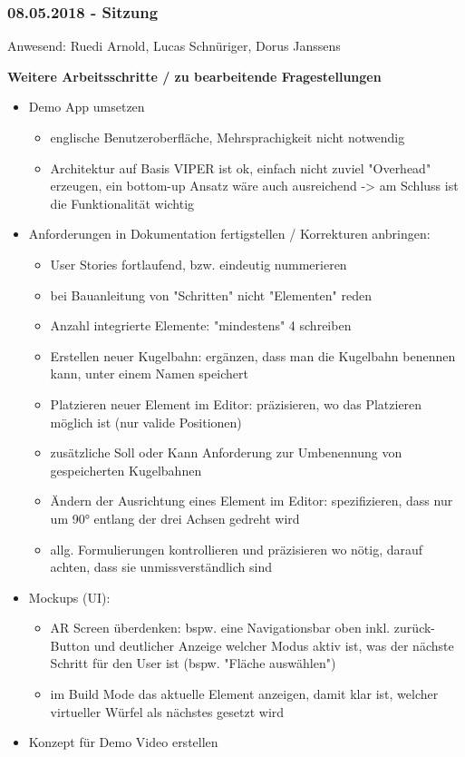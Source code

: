 \subsubsection*{08.05.2018 - Sitzung}

Anwesend: Ruedi Arnold, Lucas Schnüriger, Dorus Janssens

\textbf{Weitere Arbeitsschritte / zu bearbeitende Fragestellungen}
\begin{itemize}
	\item Demo App umsetzen
	\begin{itemize}
		\item englische Benutzeroberfläche, Mehrsprachigkeit nicht notwendig
		\item Architektur auf Basis VIPER ist ok, einfach nicht zuviel "Overhead" erzeugen, ein bottom-up Ansatz wäre auch ausreichend -> am Schluss ist die Funktionalität wichtig
	\end{itemize}
	\item Anforderungen in Dokumentation fertigstellen / Korrekturen anbringen:
	\begin{itemize}
		\item User Stories fortlaufend, bzw. eindeutig nummerieren
		\item bei Bauanleitung von "Schritten" nicht "Elementen" reden
		\item Anzahl integrierte Elemente: "mindestens" 4 schreiben
		\item Erstellen neuer Kugelbahn: ergänzen, dass man die Kugelbahn benennen kann, unter einem Namen speichert
		\item Platzieren neuer Element im Editor: präzisieren, wo das Platzieren möglich ist (nur valide Positionen)
		\item zusätzliche Soll oder Kann Anforderung zur Umbenennung von gespeicherten Kugelbahnen
		\item Ändern der Ausrichtung eines Element im Editor: spezifizieren, dass nur um 90° entlang der drei Achsen gedreht wird
		\item allg. Formulierungen kontrollieren und präzisieren wo nötig, darauf achten, dass sie unmissverständlich sind 
	\end{itemize}
	\item Mockups (UI):
	\begin{itemize}
		\item AR Screen überdenken: bspw. eine Navigationsbar oben inkl. zurück-Button und deutlicher Anzeige welcher Modus aktiv ist, was der nächste Schritt für den User ist (bspw. "Fläche auswählen")
		\item im Build Mode das aktuelle Element anzeigen, damit klar ist, welcher virtueller Würfel als nächstes gesetzt wird
	\end{itemize}
	\item Konzept für Demo Video erstellen
\end{itemize}

